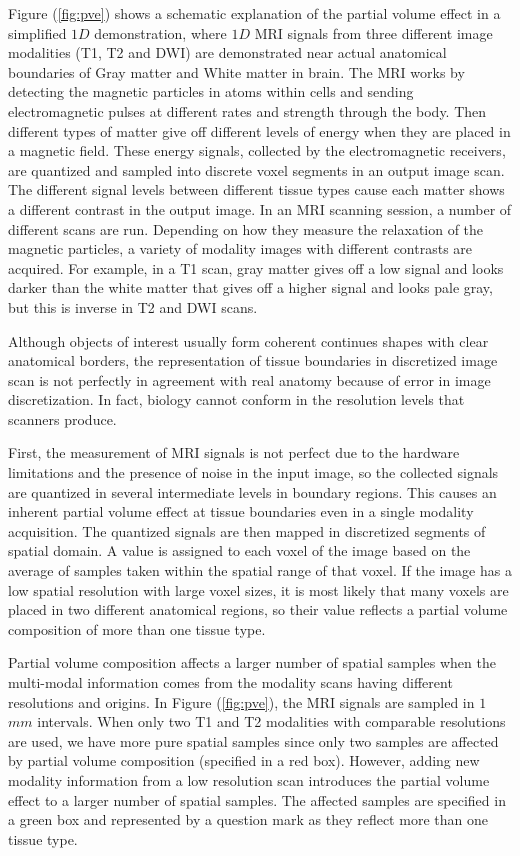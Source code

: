 Figure (\ref{fig:pve}) shows a schematic explanation of the partial volume effect in a simplified $1D$ demonstration, where $1D$ MRI signals from three different image modalities (T1, T2 and DWI) are demonstrated near actual anatomical boundaries of Gray matter and White matter in brain.
The MRI works by detecting the magnetic particles in atoms within cells and sending electromagnetic pulses at different rates and strength through the body. Then different types of matter give off different levels of energy when they are placed in a magnetic field. These energy signals, collected by the electromagnetic receivers, are quantized and sampled into discrete voxel segments in an output image scan. The different signal levels between different tissue types cause each matter shows a different contrast in the output image. In an MRI scanning session, a number of different scans are run. Depending on how they measure the relaxation of the magnetic particles, a variety of modality images with different contrasts are acquired. For example, in a T1 scan, gray matter gives off a low signal and looks darker than the white matter that gives off a higher signal and looks pale gray, but this is inverse in T2 and DWI scans.

Although objects of interest usually form coherent continues shapes with clear anatomical borders, the representation of tissue boundaries in discretized image scan is not perfectly in agreement with real anatomy because of error in image discretization. In fact, biology cannot conform in the resolution levels that scanners produce.

First, the measurement of MRI signals is not perfect due to the hardware limitations and the presence of noise in the input image, so the collected signals are quantized in several intermediate levels in boundary regions. This causes an inherent partial volume effect at tissue boundaries even in a single modality acquisition.
The quantized signals are then mapped in discretized segments of spatial domain. A value is assigned to each voxel of the image based on the average of samples taken within the spatial range of that voxel. 
If the image has a low spatial resolution with large voxel sizes, it is most likely that many voxels are placed in two different anatomical regions, so their value reflects a partial volume composition of more than one tissue type.

Partial volume composition affects a larger number of spatial samples when the multi-modal information comes from the modality scans having different resolutions and origins.
In Figure (\ref{fig:pve}), the MRI signals are sampled in $1$ $mm$ intervals. 
When only two T1 and T2 modalities with comparable resolutions are used, we have more pure spatial samples since only two samples are affected by partial volume composition (specified in a red box). 
However, adding new modality information from a low resolution scan introduces the partial volume effect to a larger number of spatial samples. The affected samples are specified in a green box and represented by a question mark as they reflect more than one tissue type.

